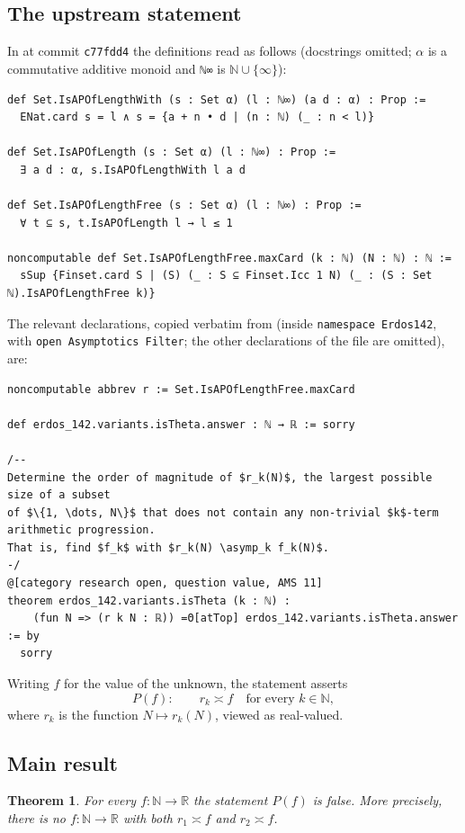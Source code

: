 \documentclass[11pt]{amsart}
\theoremstyle{plain}
\newtheorem{theorem}{Theorem}
\theoremstyle{definition}
\newcommand{\N}{\mathbb{N}}
\newcommand{\R}{\mathbb{R}}
\begin{document}
\subsection{The upstream statement}
In  at commit \texttt{c77fdd4} the definitions read as follows (docstrings omitted; $\alpha$ is a commutative additive monoid and \texttt{ℕ∞} is $\N\cup\{\infty\}$):
\begin{lstlisting}
def Set.IsAPOfLengthWith (s : Set α) (l : ℕ∞) (a d : α) : Prop :=
  ENat.card s = l ∧ s = {a + n • d | (n : ℕ) (_ : n < l)}

def Set.IsAPOfLength (s : Set α) (l : ℕ∞) : Prop :=
  ∃ a d : α, s.IsAPOfLengthWith l a d

def Set.IsAPOfLengthFree (s : Set α) (l : ℕ∞) : Prop :=
  ∀ t ⊆ s, t.IsAPOfLength l → l ≤ 1

noncomputable def Set.IsAPOfLengthFree.maxCard (k : ℕ) (N : ℕ) : ℕ :=
  sSup {Finset.card S | (S) (_ : S ⊆ Finset.Icc 1 N) (_ : (S : Set ℕ).IsAPOfLengthFree k)}
\end{lstlisting}
The relevant declarations, copied verbatim from  (inside \texttt{namespace Erdos142}, with \texttt{open Asymptotics Filter}; the other declarations of the file are omitted), are:
\begin{lstlisting}
noncomputable abbrev r := Set.IsAPOfLengthFree.maxCard

def erdos_142.variants.isTheta.answer : ℕ → ℝ := sorry

/--
Determine the order of magnitude of $r_k(N)$, the largest possible size of a subset
of $\{1, \dots, N\}$ that does not contain any non-trivial $k$-term arithmetic progression.
That is, find $f_k$ with $r_k(N) \asymp_k f_k(N)$.
-/
@[category research open, question value, AMS 11]
theorem erdos_142.variants.isTheta (k : ℕ) :
    (fun N => (r k N : ℝ)) =Θ[atTop] erdos_142.variants.isTheta.answer := by
  sorry
\end{lstlisting}
Writing $f$ for the value of the unknown, the statement asserts
\begin{equation}\label{eq:P}
  P(f):\qquad r_k\asymp f\quad\text{for every }k\in\N,
\end{equation}
where $r_k$ is the function $N\mapsto r_k(N)$, viewed as real-valued.

\subsection{Main result}
\begin{theorem}\label{thm:main}
For every $f\colon\N\to\R$ the statement $P(f)$ is false. More precisely, there is no $f\colon\N\to\R$ with both $r_1\asymp f$ and $r_2\asymp f$.
\end{theorem}
\end{document}
